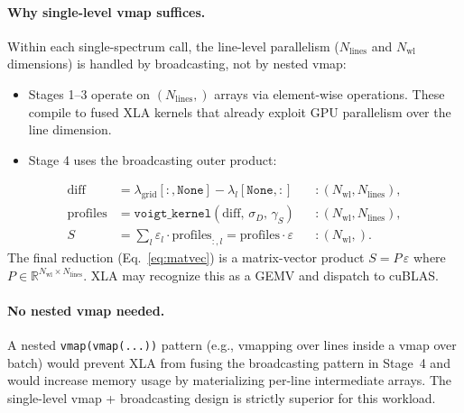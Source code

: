 \documentclass[11pt]{article}
\begin{document}
\paragraph{Why single-level vmap suffices.}
Within each single-spectrum call, the line-level parallelism
($N_\mathrm{lines}$ and $N_\mathrm{wl}$ dimensions) is handled by
broadcasting, not by nested vmap:
\begin{itemize}
  \item Stages 1--3 operate on $(N_\mathrm{lines},)$ arrays via
    element-wise operations. These compile to fused XLA kernels
    that already exploit GPU parallelism over the line dimension.
  \item Stage 4 uses the broadcasting outer product:
\end{itemize}
\begin{align}
  \mathrm{diff} &= \lambda_\mathrm{grid}[:,\texttt{None}]
    - \lambda_l[\texttt{None},:] &&\colon (N_\mathrm{wl}, N_\mathrm{lines}), \label{eq:diff}\\
  \mathrm{profiles} &= \texttt{voigt\_kernel}(\mathrm{diff},\,\sigma_D,\,\gamma_S)
    &&\colon (N_\mathrm{wl}, N_\mathrm{lines}), \label{eq:profiles}\\
  S &= \sum_l \varepsilon_l \cdot \mathrm{profiles}_{:,l}
    = \mathrm{profiles} \cdot \varepsilon
    &&\colon (N_\mathrm{wl},). \label{eq:matvec}
\end{align}
The final reduction (Eq.~\ref{eq:matvec}) is a matrix-vector product
$S = P\,\varepsilon$ where $P \in \mathbb{R}^{N_\mathrm{wl} \times N_\mathrm{lines}}$.
XLA may recognize this as a GEMV and dispatch to cuBLAS.

\paragraph{No nested vmap needed.}
A nested \texttt{vmap(vmap(...))} pattern (e.g., vmapping over lines inside
a vmap over batch) would prevent XLA from fusing the broadcasting pattern
in Stage~4 and would increase memory usage by materializing per-line
intermediate arrays. The single-level vmap + broadcasting design is
strictly superior for this workload.

\end{document}
